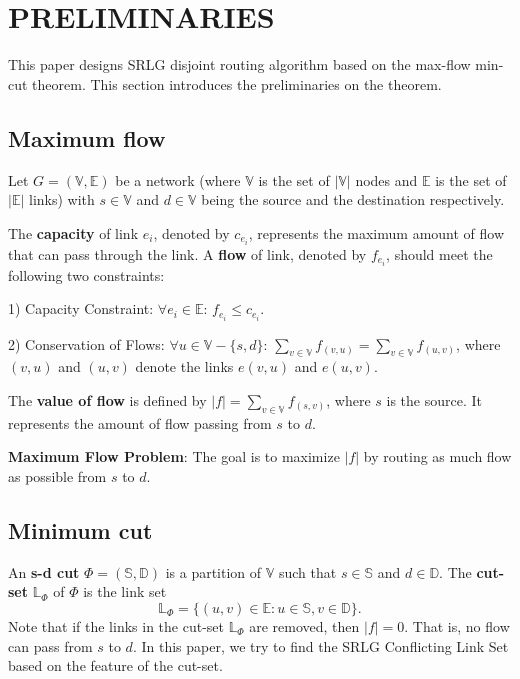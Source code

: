 \section{PRELIMINARIES}
\label{sec:PRELIMINARIES}
This paper designs   SRLG disjoint routing algorithm based on the max-flow min-cut theorem. This section introduces the preliminaries on the theorem.
\subsection{Maximum flow}
Let $G=(\mathbb{\mathbb{V}},\mathbb{\mathbb{E}})$ be a network (where $\mathbb{\mathbb{V}}$ is the set of $|\mathbb{\mathbb{V}}|$ nodes  and $\mathbb{\mathbb{E}}$ is the set of $|\mathbb{\mathbb{E}}|$ links) with $s\in \mathbb{V}$ and $d\in \mathbb{V}$ being the source and the destination respectively.

The \textbf{capacity} of  link $e_i$, denoted by $c_{e_i}$, represents the maximum amount of flow that can pass through the link. A \textbf{flow}  of  link, denoted by $f_{e_i}$, should meet the following two constraints:

1) Capacity Constraint: $\forall e_i\in \mathbb{\mathbb{E}}$: $f_{e_i}\leq c_{e_i}$.

2) Conservation of Flows: $\forall u\in \mathbb{\mathbb{V}}-\{s,d\}$: $\sum\limits_{v\in \mathbb{V}}f_{(v,u)}=\sum\limits_{v\in \mathbb{V}}f_{(u,v)}$, where $(v,u)$ and $(u,v)$ denote the links $e(v,u)$ and $e(u,v)$.

The \textbf{value of flow} is defined by $|f|=\sum\limits_{v\in \mathbb{V}}f_{(s,v)}$, where $s$ is the source. It represents the amount of flow passing from   $s$ to   $d$.

\textbf{Maximum Flow Problem}: The goal is to maximize $|f|$ by routing as much flow as possible from $s$ to $d$.
\subsection{Minimum cut}
An \textbf{s-d cut} ${\Phi}=(\mathbb{S},\mathbb{D})$  is a partition of $\mathbb{V}$ such that $s \in \mathbb{S}$ and $d \in \mathbb{D}$. The \textbf{cut-set} $\mathbb{\mathbb{L}}_{\Phi}$ of $\Phi$ is the link set
\begin{equation}
\mathbb{\mathbb{L}}_{\Phi}=\{(u,v)\in \mathbb{E}: u \in \mathbb{S}, v \in \mathbb{D}\}.
\end{equation}
Note that if the links in the cut-set $\mathbb{\mathbb{L}}_{\Phi}$ are removed, then $|f| = 0$. That is, no flow can pass from $s$ to $d$. In this paper,  we try to find the SRLG Conflicting Link Set based on the feature of the cut-set.

